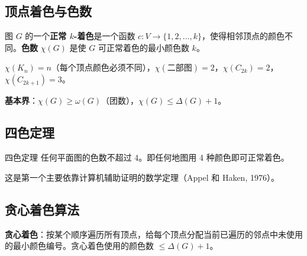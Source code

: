 \subsection{顶点着色与色数}

\begin{mydefinition}{}
图 $G$ 的一个\textbf{正常 $k$-着色}是一个函数 $c: V \to \{1, 2, \dots, k\}$，使得相邻顶点的颜色不同。\textbf{色数} $\chi(G)$ 是使 $G$ 可正常着色的最小颜色数 $k$。
\end{mydefinition}

\begin{example}
$\chi(K_n) = n$（每个顶点颜色必须不同），$\chi(\text{二部图}) = 2$，$\chi(C_{2k}) = 2$，$\chi(C_{2k+1}) = 3$。
\end{example}

\textbf{基本界}：$\chi(G) \geq \omega(G)$（团数），$\chi(G) \leq \Delta(G) + 1$。

\subsection{四色定理}

\begin{myTheorem}{四色定理}
任何平面图的色数不超过 4。即任何地图用 4 种颜色即可正常着色。
\end{myTheorem}

这是第一个主要依靠计算机辅助证明的数学定理（Appel 和 Haken, 1976）。

\begin{center}
\end{center}

\subsection{贪心着色算法}

\textbf{贪心着色}：按某个顺序遍历所有顶点，给每个顶点分配当前已遍历的邻点中未使用的最小颜色编号。贪心着色使用的颜色数 $\leq \Delta(G) + 1$。


